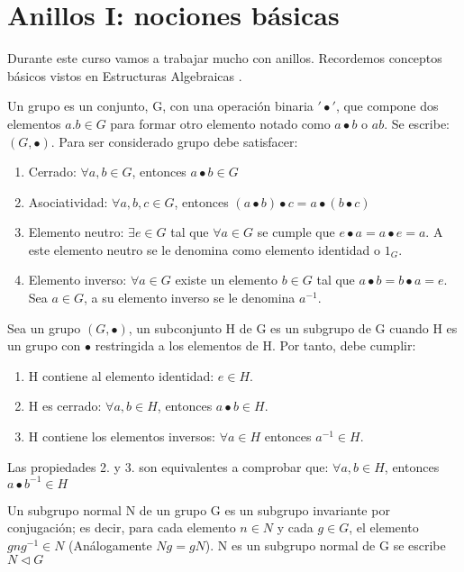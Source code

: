 \chapter{Anillos I: nociones básicas}

Durante este curso vamos a trabajar mucho con anillos. Recordemos conceptos básicos vistos en Estructuras Algebraicas \cite{apuntesEA}.


\begin{defn}[Grupo]
Un grupo es un conjunto, G, con una operación binaria $'\bullet'$, que compone dos elementos $a.b \in G$ para formar otro elemento notado como $a \bullet b$ o $ab$. Se escribe: $(G,\bullet)$. Para ser considerado grupo debe satisfacer:
\begin{enumerate}
	\item Cerrado: $\forall a,b \in G$, entonces $a \bullet b \in G$
	\item Asociatividad: $\forall a,b,c \in G$, entonces $(a\bullet b) \bullet c = a \bullet (b \bullet c)$
	\item Elemento neutro: $\exists e \in G$ tal que $\forall a \in G$ se cumple que $e\bullet a=a\bullet e = a$. A este elemento neutro se le denomina como elemento identidad o $1_G$.
	\item Elemento inverso: $\forall a \in G$ existe un elemento $b \in G$ tal que $a \bullet b = b \bullet a = e$. Sea $a \in G$, a su elemento inverso se le denomina $a^{-1}$.
\end{enumerate}
\end{defn}

\begin{defn}[Subgrupo]
Sea un grupo  $(G,\bullet)$, un subconjunto H de G es un subgrupo de G cuando H es un grupo con $\bullet$ restringida a los elementos de H. Por tanto, debe cumplir:
\begin{enumerate}
	\item H contiene al elemento identidad: $e \in H$.
	\item H es cerrado: $\forall a,b \in H$, entonces $a \bullet b \in H$.
	\item H contiene los elementos inversos: $\forall a \in H$ entonces $a^{-1} \in H$.
\end{enumerate}
\obs Las propiedades 2. y 3. son equivalentes a comprobar que: $\forall a,b \in H$, entonces $a \bullet b^{-1}  \in H$
\end{defn}

\begin{defn}
	Un subgrupo normal N de un grupo G es un subgrupo invariante por conjugación; es decir, para cada elemento $n \in N$ y cada $g \in G$, el elemento $gng^{-1} \in N$ (Análogamente $Ng = gN$). N es un subgrupo normal de G se escribe $N \triangleleft G$
\end{defn}

